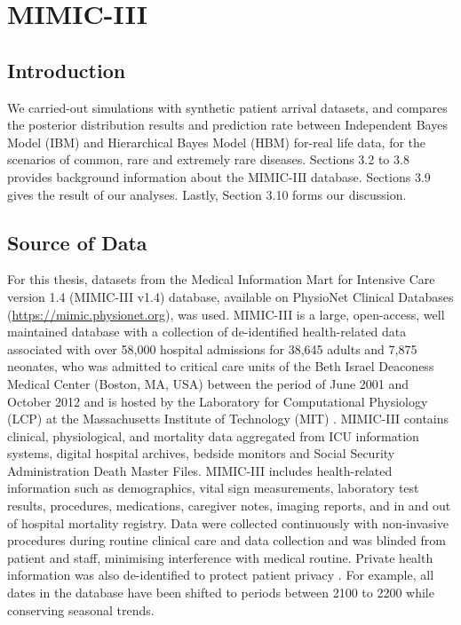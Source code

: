 \chapter{MIMIC-III}\label{chap:MIMIC}

\section{Introduction}

We carried-out simulations with synthetic patient arrival datasets, and compares the posterior distribution results and prediction rate between Independent Bayes Model (IBM) and Hierarchical Bayes Model (HBM) for-real life data, for the scenarios of common, rare and extremely rare diseases. Sections 3.2 to 3.8 provides background information about the MIMIC-III database. Sections 3.9 gives the result of our analyses. Lastly,  Section 3.10 forms our discussion. 

\section{Source of Data}

For this thesis, datasets from the Medical Information Mart for Intensive Care version 1.4 (MIMIC-III v1.4) database, available on PhysioNet Clinical Databases (\href{https://mimic.physionet.org}{https://mimic.physionet.org}), was used. MIMIC-III is a large, open-access, well maintained database with a collection of de-identified health-related data associated with over 58,000 hospital admissions for 38,645 adults and 7,875 neonates, who was admitted to critical care units of the Beth Israel Deaconess Medical Center (Boston, MA, USA) between the period of June 2001 and October 2012 and is hosted by the Laboratory for Computational Physiology (LCP) at the Massachusetts Institute of Technology (MIT) \citep{johnson2016mimic,Pollard2016mimic,goldberger2000physiobank}. MIMIC-III contains clinical, physiological, and mortality data aggregated from ICU information systems, digital hospital archives, bedside monitors and Social Security Administration Death Master Files. MIMIC-III includes health-related information such as demographics, vital sign measurements, laboratory test results, procedures, medications, caregiver notes, imaging reports, and in and out of hospital mortality registry. Data were collected continuously with non-invasive procedures during routine clinical care and data collection and was blinded from patient and staff, minimising interference with medical routine. Private health information was also de-identified to protect patient privacy \citep{Mark2016}. For example, all dates in the database have been shifted to periods between 2100 to 2200 while conserving seasonal trends. 

